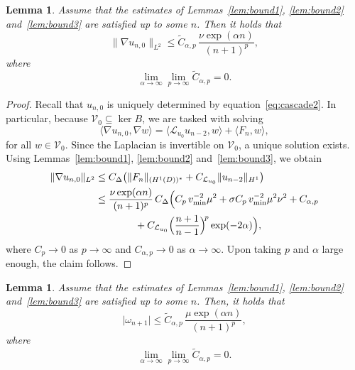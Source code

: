 \documentclass[a4paper,reqno,twoside]{amsart}
\numberwithin{equation}{section}
\newtheorem{lemma}[theorem]{Lemma}
\theoremstyle{definition}
\newcommand{\<}{\ensuremath \leq}
\renewcommand{\>}{\ensuremath \geq}
\begin{document}
\begin{lemma}\label{lem:bound4}
    Assume that the estimates of Lemmas~\ref{lem:bound1}, \ref{lem:bound2} and~\ref{lem:bound3} are satisfied up to some $n$.
    Then it holds that
    \begin{equation}
        \lVert \nabla u_{n,0} \rVert_{L^2}
        \leq \widetilde{C}_{\alpha,p} \, \frac{\nu \exp(\alpha n)}{(n+1)^p},
    \end{equation}
    where
    \begin{equation}
        \lim_{\alpha \to \infty} \lim_{p \to \infty} \widetilde{C}_{\alpha,p} = 0.
    \end{equation}
\end{lemma}

\begin{proof}
    Recall that $u_{n,0}$ is uniquely determined by equation~\eqref{eq:cascade2}.
    In particular, because $\mathcal{V}_0 \subseteq \ker B$, we are tasked with solving
    \begin{equation}
        \langle \nabla u_{n,0}, \nabla w \rangle
        = \langle \mathcal{L}_{u_0} u_{n-2}, w \rangle + \langle F_n, w \rangle,
    \end{equation}
    for all $w \in \mathcal{V}_0$.
    Since the Laplacian is invertible on $\mathcal{V}_0$, a unique solution exists.
    Using Lemmas~\ref{lem:bound1}, \ref{lem:bound2} and~\ref{lem:bound3}, we obtain
    \begin{equation}
        \begin{aligned}
            \lVert \nabla u_{n,0} \rVert_{L^2}
            &\leq C_\Delta \bigl(
              \lVert F_n \rVert_{(H^1(D))^*}
              + C_{\mathcal{L}_{u_0}} \lVert u_{n-2} \rVert_{H^1}
            \bigr) \\
            &\leq \frac{\nu \exp(\alpha n)}{(n+1)^p} \, C_\Delta
            \Bigl(
              C_p \, v_{\min}^{-2} \mu^2
              + \sigma C_p \, v_{\min}^{-2} \mu^2 \nu^2
              + C_{\alpha,p} \\
            &\qquad\qquad
              + C_{\mathcal{L}_{u_0}}
              \Bigl( \frac{n+1}{n-1} \Bigr)^{\!p} \exp(-2\alpha)
            \Bigr),
        \end{aligned}
    \end{equation}
    where $C_p \to 0$ as $p \to \infty$ and $C_{\alpha,p} \to 0$ as $\alpha \to \infty$.
    Upon taking $p$ and $\alpha$ large enough, the claim follows.
\end{proof}


\begin{lemma}\label{lem:bound5}
    Assume that the estimates of Lemmas~\ref{lem:bound1}, \ref{lem:bound2}
    and~\ref{lem:bound3} are satisfied up to some $n$.
    Then, it holds that
    \begin{equation}
        \lvert \omega_{n+1} \rvert
        \leq \widetilde{C}_{\alpha,p} \, \frac{\mu \exp(\alpha n)}{(n+1)^p},
    \end{equation}
    where
    \begin{equation}
        \lim_{\alpha \to \infty} \lim_{p \to \infty} \widetilde{C}_{\alpha,p} = 0.
    \end{equation}
\end{lemma}
\end{document}

